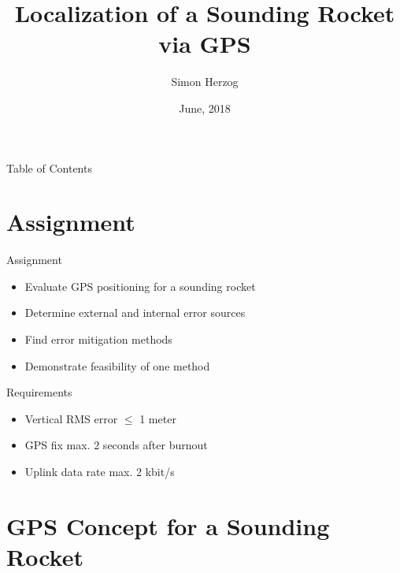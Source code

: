 \documentclass[12pt, compress, xcolor=table]{beamer}
\title{Localization of a Sounding Rocket via GPS}
\author{Simon Herzog}
\institute{Final Presentation Bachelor Thesis}
\date{June, 2018}
\begin{document}
\maketitle

\begin{frame}{Table of Contents}
 \tableofcontents
\end{frame}


\section{Assignment}

\begin{frame}{Assignment}
 \begin{itemize}
  \setlength\itemsep{0.5cm}
  \item Evaluate GPS positioning for a sounding rocket
  \item Determine external and internal error sources
  \item Find error mitigation methods
  \item Demonstrate feasibility of one method
 \end{itemize}
\end{frame}

\begin{frame}{Requirements}
 \begin{itemize}
  \setlength\itemsep{0.5cm}
  \item Vertical RMS error $\le$ 1 meter
  \item GPS fix max. 2 seconds after burnout
  \item Uplink data rate max. 2 kbit/s
 \end{itemize}
\end{frame}


\section{GPS Concept for a Sounding Rocket}
\end{document}
